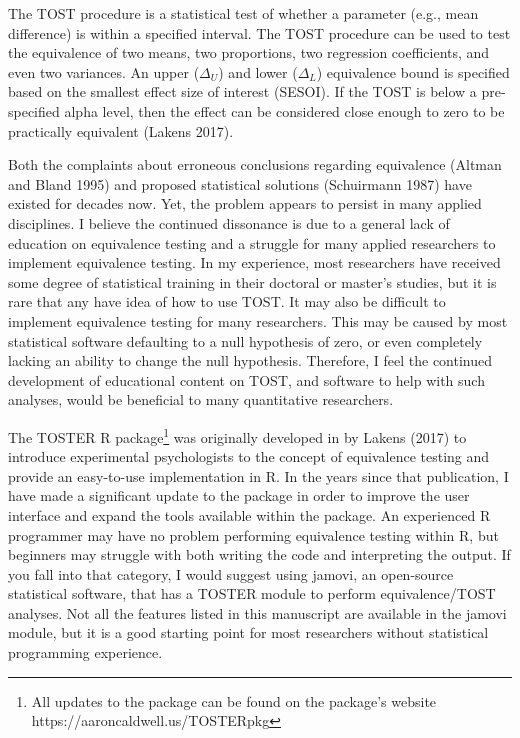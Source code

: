 \documentclass[
]{interact}
\begin{document}
The TOST procedure is a statistical test of whether a parameter (e.g.,
mean difference) is within a specified interval. The TOST procedure can
be used to test the equivalence of two means, two proportions, two
regression coefficients, and even two variances. An upper (\(\Delta_U\))
and lower (\(\Delta_L\)) equivalence bound is specified based on the
smallest effect size of interest (SESOI). If the TOST is below a
pre-specified alpha level, then the effect can be considered close
enough to zero to be practically equivalent (Lakens 2017).

Both the complaints about erroneous conclusions regarding equivalence
(Altman and Bland 1995) and proposed statistical solutions (Schuirmann
1987) have existed for decades now. Yet, the problem appears to persist
in many applied disciplines. I believe the continued dissonance is due
to a general lack of education on equivalence testing and a struggle for
many applied researchers to implement equivalence testing. In my
experience, most researchers have received some degree of statistical
training in their doctoral or master's studies, but it is rare that any
have idea of how to use TOST. It may also be difficult to implement
equivalence testing for many researchers. This may be caused by most
statistical software defaulting to a null hypothesis of zero, or even
completely lacking an ability to change the null hypothesis. Therefore,
I feel the continued development of educational content on TOST, and
software to help with such analyses, would be beneficial to many
quantitative researchers.

The TOSTER R package\footnote{All updates to the package can be found on
  the package's website https://aaroncaldwell.us/TOSTERpkg} was
originally developed in by Lakens (2017) to introduce experimental
psychologists to the concept of equivalence testing and provide an
easy-to-use implementation in R. In the years since that publication, I
have made a significant update to the package in order to improve the
user interface and expand the tools available within the package. An
experienced R programmer may have no problem performing equivalence
testing within R, but beginners may struggle with both writing the code
and interpreting the output. If you fall into that category, I would
suggest using jamovi, an open-source statistical software, that has a
TOSTER module to perform equivalence/TOST analyses. Not all the features
listed in this manuscript are available in the jamovi module, but it is
a good starting point for most researchers without statistical
programming experience.
\end{document}
